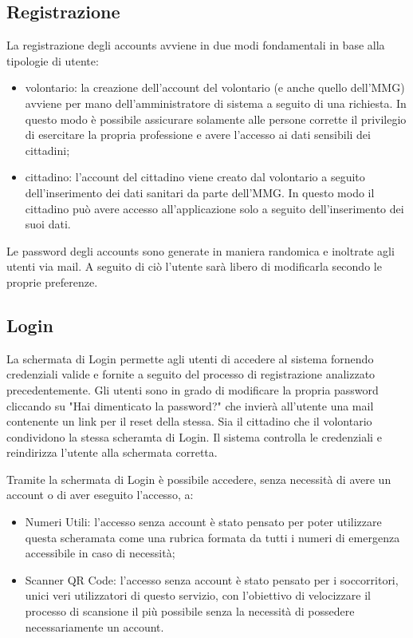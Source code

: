 \documentclass[12pt,a4paper,twoside,openright,titlepage]{book}
\begin{document}
\subsection{Registrazione}
La registrazione degli accounts avviene in due modi fondamentali in base alla tipologie di utente:
\begin{itemize}
\item volontario: la creazione dell'account del volontario (e anche quello dell'MMG) avviene per mano dell'amministratore di sistema a seguito di una richiesta. In questo modo è possibile assicurare solamente alle persone corrette il privilegio di esercitare la propria professione e avere l'accesso ai dati sensibili dei cittadini;
\item cittadino: l'account del cittadino viene creato dal volontario a seguito dell'inserimento dei dati sanitari da parte dell'MMG. In questo modo il cittadino può avere accesso all'applicazione solo a seguito dell'inserimento dei suoi dati.
\end{itemize}
Le password degli accounts sono generate in maniera randomica e inoltrate agli utenti via mail. A seguito di ciò l'utente sarà libero di modificarla secondo le proprie preferenze.

\subsection{Login}
La schermata di Login permette agli utenti di accedere al sistema fornendo credenziali valide e fornite a seguito del processo di registrazione analizzato precedentemente. Gli utenti sono in grado di modificare la propria password cliccando su "Hai dimenticato la password?" che invierà all'utente una mail contenente un link per il reset della stessa. Sia il cittadino che il volontario condividono la stessa scheramta di Login. Il sistema controlla le credenziali e reindirizza l'utente alla schermata corretta.\newline

Tramite la schermata di Login è possibile accedere, senza necessità di avere un account o di aver eseguito l'accesso, a:
\begin{itemize}
\item Numeri Utili: l'accesso senza account è stato pensato per poter utilizzare questa scheramata come una rubrica formata da tutti i numeri di emergenza accessibile in caso di necessità;
\item Scanner QR Code: l'accesso senza account è stato pensato per i soccorritori, unici veri utilizzatori di questo servizio, con l'obiettivo di velocizzare il processo di scansione il più possibile senza la necessità di possedere necessariamente un account.
\end{itemize}
\end{document}

